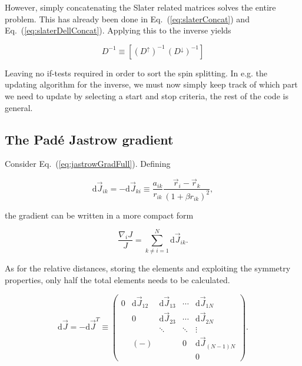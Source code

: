 However, simply concatenating the Slater related matrices solves the entire problem. This has already been done in Eq.~(\ref{eq:slaterConcat}) and Eq.~(\ref{eq:slaterDellConcat}). Applying this to the inverse yields

\begin{equation}
 D^{-1} \equiv \left[(D^\uparrow)^{-1}\,(D^\downarrow)^{-1}\right]
\end{equation}

Leaving no if-tests required in order to sort the spin splitting. In e.g. the updating algorithm for the inverse, we must now simply keep track of which part we need to update by selecting a start and stop criteria, the rest of the code is general.

\subsection{The Padé Jastrow gradient}
\label{sec:optJastGrad}

Consider Eq.~(\ref{eq:jastrowGradFull}). Defining

\begin{equation}
 \mathrm{d}\vec J_{ik} = -\mathrm{d}\vec J_{ki} \equiv \frac{a_{ik}}{r_{ik}}\frac{\vec r_i - \vec r_k}{(1 + \beta r_{ik})^2},
\end{equation}

the gradient can be written in a more compact form

\begin{equation}
 \frac{\nabla_i J}{J} = \sum_{k \ne i = 1}^N \mathrm{d}\vec J_{ik}.
\end{equation}

As for the relative distances, storing the elements and exploiting the symmetry properties, only half the total elements needs to be calculated. 

\begin{equation}
\label{eq:jastrowDJ}
 \mathrm{d}\vec J = -\mathrm{d}\vec J^T \equiv \left( \begin{array}{ccccc}
0 & \mathrm{d}\vec J_{12} & \mathrm{d}\vec J_{13} & \cdots & \mathrm{d}\vec J_{1N} \\
 & 0 & \mathrm{d}\vec J_{23} & \cdots & \mathrm{d}\vec J_{2N}  \\
 &  & \ddots & \ddots & \vdots \\
 & (-) &  & 0 & \mathrm{d}\vec J_{(N-1)N} \\
 &  &  &  & 0\end{array} \right).
\end{equation}

